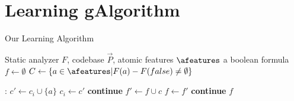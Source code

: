 \section{Learning gAlgorithm}
\begin{algorithm}[t]
\caption{Our Learning Algorithm}\label{alg:learning-outer}
\begin{algorithmic}[1]
\Require Static analyzer $F$, codebase $\vec{P}$, 
atomic features $\afeatures$
\Ensure a boolean formula 
\State $f \gets \emptyset$
\State $C \gets \{ a \in \afeatures | F(a) - F(false) \neq \emptyset\}$

 :
    \State $c' \gets c_i \cup \{a\}$
        \State $c_i \gets c'$
      \Else
        \State \textbf{continue}
      \EndIf
  \EndWhile
\EndFor
    \State $f' \gets f \cup c$
        \State $f \gets f'$
      \Else
        \State \textbf{continue}
      \EndIf
  \EndWhile
\State \Return $f$
\EndProcedure
\end{algorithmic}
\end{algorithm}
